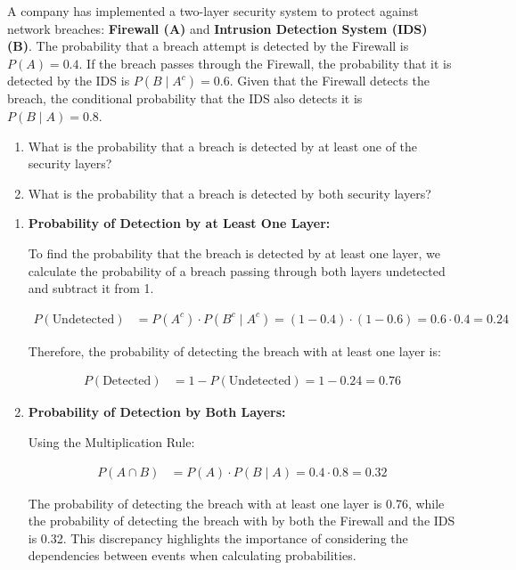 \begin{example}
A company has implemented a two-layer security system to protect against network breaches: \textbf{Firewall (A)} and \textbf{Intrusion Detection System (IDS) (B)}. The probability that a breach attempt is detected by the Firewall is \( P(A) = 0.4 \). If the breach passes through the Firewall, the probability that it is detected by the IDS is \( P(B \mid A^c) = 0.6 \). Given that the Firewall detects the breach, the conditional probability that the IDS also detects it is \( P(B \mid A) = 0.8 \).

\begin{enumerate}[label=(\alph*)]
    \item What is the probability that a breach is detected by at least one of the security layers?
    \item What is the probability that a breach is detected by both security layers?
\end{enumerate}

\end{example}

\begin{solution}
\begin{enumerate}[label=(\alph*)]
    \item \textbf{Probability of Detection by at Least One Layer:}

    To find the probability that the breach is detected by at least one layer, we calculate the probability of a breach passing through both layers undetected and subtract it from 1.

    \begin{align*}
        P(\text{Undetected}) &= P(A^c) \cdot P(B^c \mid A^c) 
        = (1 - 0.4) \cdot (1 - 0.6) 
        = 0.6 \cdot 0.4
        = 0.24
    \end{align*}

    Therefore, the probability of detecting the breach with at least one layer is:

    \begin{align*}
    P(\text{Detected}) &= 1 - P(\text{Undetected}) = 1 - 0.24 = 0.76
    \end{align*}

    \item \textbf{Probability of Detection by Both Layers:}

    Using the Multiplication Rule:

    \begin{align*}
    P(A \cap B) &= P(A) \cdot P(B \mid A) = 0.4 \cdot 0.8 = 0.32
    \end{align*}

    The probability of detecting the breach with at least one layer is 0.76, while the probability of detecting the breach with by both the Firewall and the IDS is 0.32. This discrepancy highlights the importance of considering the dependencies between events when calculating probabilities.
\end{enumerate}
\end{solution}

